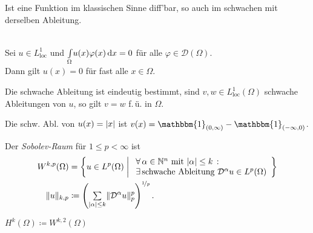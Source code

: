 \documentclass{cheat-sheet}
\newcommand{\DO}{\mathcal{D}} %
\newcommand{\loc}{\text{loc}} %
\newcommand{\ind}{\mathbbm{1}} %
\newcommand{\Testfun}{\mathcal{D}} %
\begin{document}
\begin{bem}
  Ist eine Funktion im klassischen Sinne diff'bar, so auch im schwachen mit derselben Ableitung.
\end{bem}

\begin{lem} \mbox{}\\
  Sei $u \in L^1_\loc$ und ${\textstyle \int\limits_{\Omega}^{}} u(x) \varphi(x) \,\mathrm{d} x = 0$ für alle $\varphi \in \Testfun(\Omega)$. \\
  Dann gilt $u(x) = 0$ für fast alle $x \in \Omega$.
\end{lem}

\begin{kor}
  Die schwache Ableitung ist eindeutig bestimmt, \dh{} sind $v, w \in L^1_\loc(\Omega)$ schwache Ableitungen von $u$, so gilt $v = w$ f.\,ü. in $\Omega$.
\end{kor}

\begin{bsp}
  Die schw. Abl. von $u(x) = \lvert x\rvert$ ist $v(x) = \ind_{\ointerval{0}{\infty}} - \ind_{\ointerval{- \infty}{0}}$.
\end{bsp}

\begin{lem}
  \inlineitem{$\DO^\alpha (u + \lambda v) = \DO^\alpha u + \lambda \DO^\alpha v$} \quad
  \inlineitem{$\DO^{\alpha + \beta} u = \DO^\alpha (\DO^\beta u)$}
\end{lem}

\begin{defn}
  Der \emph{Sobolev-Raum} für $1 \leq p < \infty$ ist
  \begin{align*}
    W^{k,p}(\Omega) & = \left\{ u \in L^p(\Omega) \;\middle|\; \begin{array}{l}
      \fa{\alpha \in \N^n \text{ mit } \abs{\alpha} \leq k} \\
      \exists \, \text{schwache Ableitung $\DO^\alpha u \in L^p(\Omega)$}
    \end{array} \right\} \\
    \norm{u}_{k,p} & \coloneqq \left( \sum_{\abs{\alpha} \leq k} \norm{\DO^\alpha u}_p^p \right)^{\nicefrac{1}{p}}.
  \end{align*}
\end{defn}

\begin{nota}
  $H^k(\Omega) \coloneqq W^{k,2}(\Omega)$
\end{nota}

\end{document}
